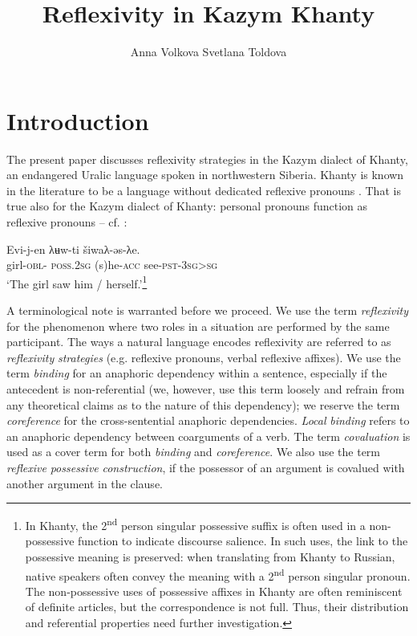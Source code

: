 \documentclass[output=paper]{langscibook}
\author{Anna Volkova\affiliation{National Research University} \lastand Svetlana Toldova\affiliation{Higher School of Economics, Russian Federation}}
\title{Reflexivity in Kazym Khanty}
\begin{document}
\maketitle 

\section{Introduction}\label{sec:Volkova:1}

The present paper discusses reflexivity strategies in the Kazym dialect of Khanty, an endangered Uralic language spoken in northwestern Siberia. Khanty is known in the literature to be a language without dedicated reflexive pronouns \citep{Nikolaeva1995, Nikolaeva1999Ostyak}. That is true also for the Kazym dialect of Khanty: personal pronouns function as reflexive pronouns -- cf. :

\ea 
\label{ex:Volkova:1}
 \gll Evi-j-en λʉw-ti šiwaλ-əs-λe.\\
 girl\textsc{{}-obl-}%
\textsc{poss.2sg} (s)he\textsc{{}-acc} see\textsc{{}-pst-3sg>sg}\\
 \glt ‘The girl saw him / herself.’\footnote{In Khanty, the 2\textsuperscript{nd} person singular possessive suffix is often used in a non-possessive function to indicate discourse salience. In such uses, the link to the possessive meaning is preserved: when translating from Khanty to Russian, native speakers often convey the meaning with a 2\textsuperscript{nd} person singular pronoun. The non-possessive uses of possessive affixes in Khanty are often reminiscent of definite articles, but the correspondence is not full. Thus, their distribution and referential properties need further investigation.}
\z


A terminological note is warranted before we proceed. We use the term \textit{reflexivity} for the phenomenon where two roles in a situation are performed by the same participant. The ways a natural language encodes reflexivity are referred to as \textit{reflexivity} \textit{strategies} (e.g. reflexive pronouns,
verbal reflexive affixes). We use the term \textit{binding} for an anaphoric dependency within a sentence, especially if the antecedent is non-referential (we, however, use this term loosely and refrain from any theoretical claims as to the nature of this dependency); we reserve the term \textit{coreference} for the cross-sentential anaphoric dependencies. \textit{Local} \textit{binding} refers to an anaphoric dependency between coarguments of a verb. The term \textit{covaluation} is used as a cover term for both \textit{binding} and \textit{coreference}. We also use the term %
\textit{reflexive} \textit{possessive} \textit{construction}, if the possessor of an argument is covalued with another argument in the clause. 
\end{document}
